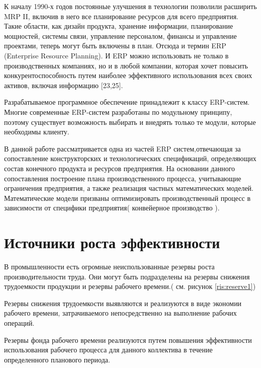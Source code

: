 К началу 1990-х годов постоянные улучшения в технологии позволили расширить MRP II, включив в него все планирование ресурсов для всего предприятия. Такие области, как дизайн продукта, хранение информации, планирование мощностей, системы связи, управление персоналом, финансы и управление проектами, теперь могут быть включены в план. Отсюда и термин ERP (Enterprise Resource Planning). И ERP можно использовать не только в производственных компаниях, но и в любой компании, которая хочет повысить конкурентоспособность путем наиболее эффективного использования всех своих активов, включая информацию \cite{ptak_schragenheim_2004} [23,25].

Разрабатываемое программное обеспечение принадлежит к классу ERP-систем. Многие современные ERP-систем разработаны по модульному принципу, поэтому существует возможность выбирать и внедрять только те модули, которые необходимы клиенту. 

В данной работе рассматривается одна из частей ERP систем,отвечающая за сопоставление конструкторских и технологических спецификаций, определяющих состав конечного продукта и ресурсов предприятия. На основании данного сопоставления построение плана производственного процесса, учитывающие ограничения предприятия, а также реализация частных математических моделей. Математические модели призваны оптимизировать производственный процесс в зависимости от специфики предприятия( конвейерное производство ).


\section{Источники роста эффективности}

В промышленности есть огромные неиспользованные резервы роста производительности труда. Они могут быть подразделены на резервы снижения трудоемкости продукции и резервы рабочего времени.( см. рисунок \ref{ris:reserve1})

Резервы снижения трудоемкости выявляются и реализуются в виде экономии рабочего времени, затрачиваемого непосредственно на выполнение рабочих операций.

Резервы фонда рабочего времени реализуются путем повышения эффективности использования рабочего процесса для данного коллектива в течение определенного планового периода\cite{Lenin}. 


